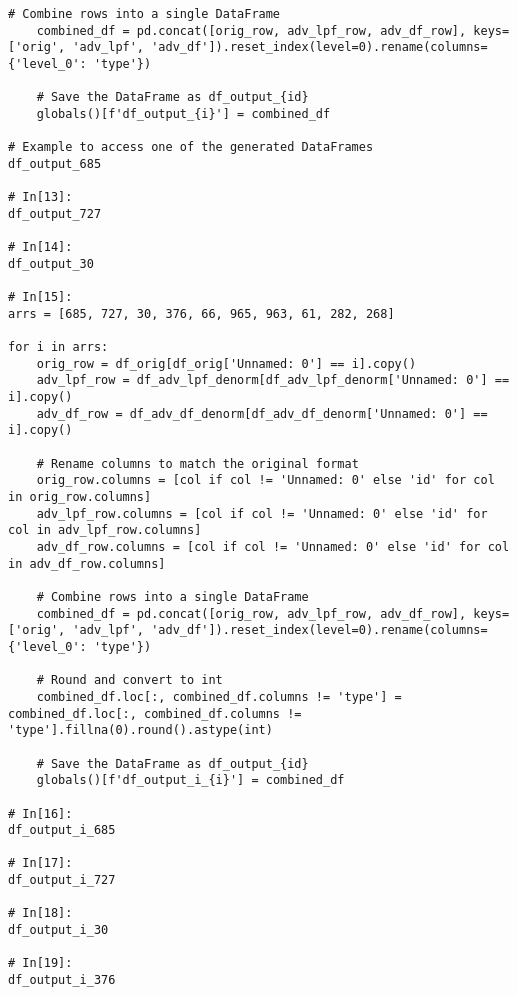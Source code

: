 \begin{lstlisting}[style=jupyter, caption=敵対的サンプルを生成する流れの処理]
    # Combine rows into a single DataFrame
    combined_df = pd.concat([orig_row, adv_lpf_row, adv_df_row], keys=['orig', 'adv_lpf', 'adv_df']).reset_index(level=0).rename(columns={'level_0': 'type'})
    
    # Save the DataFrame as df_output_{id}
    globals()[f'df_output_{i}'] = combined_df

# Example to access one of the generated DataFrames
df_output_685

# In[13]:
df_output_727

# In[14]:
df_output_30

# In[15]:
arrs = [685, 727, 30, 376, 66, 965, 963, 61, 282, 268]

for i in arrs:
    orig_row = df_orig[df_orig['Unnamed: 0'] == i].copy()
    adv_lpf_row = df_adv_lpf_denorm[df_adv_lpf_denorm['Unnamed: 0'] == i].copy()
    adv_df_row = df_adv_df_denorm[df_adv_df_denorm['Unnamed: 0'] == i].copy()
    
    # Rename columns to match the original format
    orig_row.columns = [col if col != 'Unnamed: 0' else 'id' for col in orig_row.columns]
    adv_lpf_row.columns = [col if col != 'Unnamed: 0' else 'id' for col in adv_lpf_row.columns]
    adv_df_row.columns = [col if col != 'Unnamed: 0' else 'id' for col in adv_df_row.columns]
    
    # Combine rows into a single DataFrame
    combined_df = pd.concat([orig_row, adv_lpf_row, adv_df_row], keys=['orig', 'adv_lpf', 'adv_df']).reset_index(level=0).rename(columns={'level_0': 'type'})
    
    # Round and convert to int
    combined_df.loc[:, combined_df.columns != 'type'] = combined_df.loc[:, combined_df.columns != 'type'].fillna(0).round().astype(int)
    
    # Save the DataFrame as df_output_{id}
    globals()[f'df_output_i_{i}'] = combined_df

# In[16]:
df_output_i_685

# In[17]:
df_output_i_727

# In[18]:
df_output_i_30

# In[19]:
df_output_i_376



\end{lstlisting}